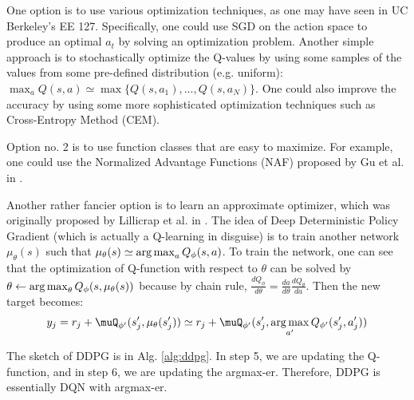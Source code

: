 One option is to use various optimization techniques, as one may have seen in UC Berkeley's EE 127. Specifically, one could use SGD on the action space to produce an optimal $a_t$ by solving an optimization problem. Another simple approach is to stochastically optimize the Q-values by using some samples of the values from some pre-defined distribution (e.g. uniform): $\max_a Q(s,a) \simeq \max \{Q(s,a_1), ..., Q(s,a_N)\}$. One could also improve the accuracy by using some more sophisticated optimization techniques such as Cross-Entropy Method (CEM).

Option no. 2 is to use function classes that are easy to maximize. For example, one could use the Normalized Advantage Functions (NAF) proposed by Gu et al. in \cite{gu2016continuous}.

Another rather fancier option is to learn an approximate optimizer, which was originally proposed by Lillicrap et al. in \cite{lillicrap2015continuous}. The idea of Deep Deterministic Policy Gradient (which is actually a Q-learning in disguise) is to train another network $\mu_\theta(s)$ such that $\mu_\theta(s) \simeq \operatorname*{arg\,max}_a Q_\phi(s,a)$. To train the network, one can see that the optimization of Q-function with respect to $\theta$ can be solved by $\theta \leftarrow \operatorname*{arg\,max}_\theta Q_\phi(s,\mu_\theta(s))$ because by chain rule, $\frac{dQ_\phi}{d\theta} = \frac{da}{d\theta}\frac{dQ_\theta}{da}$. Then the new target becomes:
$$y_j = r_j + \muQ_{\phi'}(s'_j,\mu_\theta(s'_j))\simeq r_j + \muQ_{\phi'}(s'_j, \argmaxA_{a'}Q_{\phi'}(s'_j,a'_j))$$

The sketch of DDPG is in Alg. \ref{alg:ddpg}. In step 5, we are updating the Q-function, and in step 6, we are updating the argmax-er. Therefore, DDPG is essentially DQN with argmax-er.



